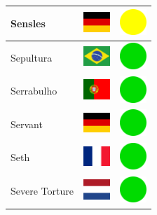 \documentclass[12pt, a4paper, twoside]{report}
\begin{document}
\begin{center}
\begin{longtable}{|p{5cm}|p{2cm}|p{2cm}|}
Sensles & \includegraphics[width=1cm]{4x3/de} & \includegraphics[width=1cm]{likes/m} \\ \hline
Sepultura & \includegraphics[width=1cm]{4x3/br} & \includegraphics[width=1cm]{likes/y} \\ \hline
Serrabulho & \includegraphics[width=1cm]{4x3/pt} & \includegraphics[width=1cm]{likes/y} \\ \hline
Servant & \includegraphics[width=1cm]{4x3/de} & \includegraphics[width=1cm]{likes/y} \\ \hline
Seth & \includegraphics[width=1cm]{4x3/fr} & \includegraphics[width=1cm]{likes/y} \\ \hline
Severe Torture & \includegraphics[width=1cm]{4x3/nl} & \includegraphics[width=1cm]{likes/y} \\ \hline

\end{longtable}
\end{center}
\end{document}
